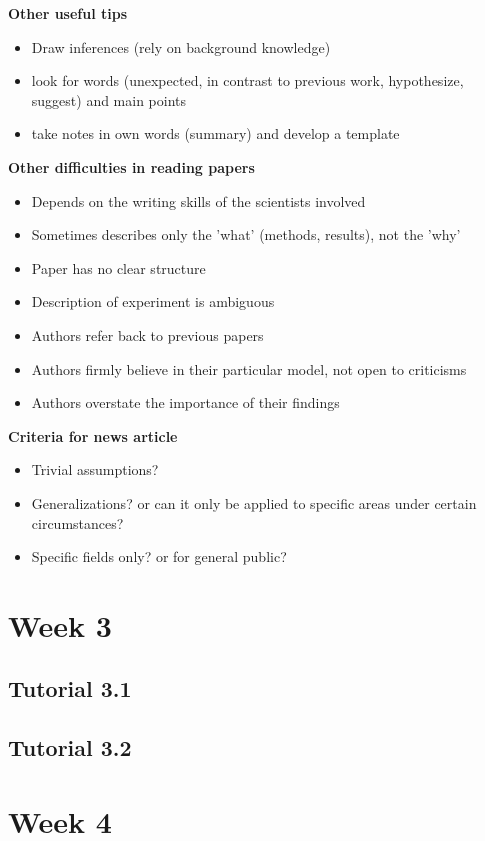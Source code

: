 \documentclass{article}
\begin{document}
\begin{multicols}{2}
\textbf{Other useful tips}
\begin{itemize}
	\item Draw inferences (rely on background knowledge)
	\item look for words (unexpected, in contrast to previous work, hypothesize, suggest) and main points
	\item take notes in own words (summary) and develop a template
\end{itemize}
\textbf{Other difficulties in reading papers}
\begin{itemize}
	\item Depends on the writing skills of the scientists involved
	\item Sometimes describes only the 'what' (methods, results), not the 'why'
	\item Paper has no clear structure
	\item Description of experiment is ambiguous
	\item Authors refer back to previous papers
	\item Authors firmly believe in their particular model, not open to criticisms
	\item Authors overstate the importance of their findings
\end{itemize}

\textbf{Criteria for news article}
\begin{itemize}
	\item Trivial assumptions?
	\item Generalizations? or can it only be applied to specific areas under certain circumstances?
	\item Specific fields only? or for general public?

\end{itemize}


\section{Week 3}
\subsection{Tutorial 3.1}
\subsection{Tutorial 3.2}
\section{Week 4}

\end{multicols}
\end{document}
